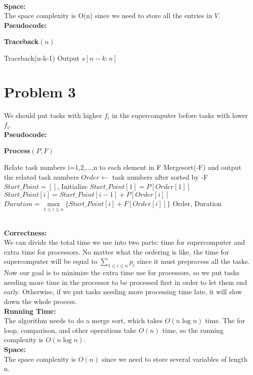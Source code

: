 \documentclass[twoside]{homework}
\begin{document}
\\\textbf{Space:} \quad
\\The space complexity is O(n) since we need to store all the entries in $V$.
\\\textbf{Pseudocode:} \quad
\begin{algorithm}
	\caption*{\textbf{Traceback$(n)$}}
	\begin{algorithmic}
		\RETURN 
		\ELSE
		\STATE Traceback(n-k-1)
		\STATE Output $s[n-k:n]$
		\ENDIF
		\ENDFOR
		\ENDIF
	\end{algorithmic}		
\end{algorithm}

\section*{Problem 3}
We should put tasks with higher $f_i$ in the supercomputer before tasks with lower $f_i$.
\\\textbf{Pseudocode:} \quad
\begin{algorithm}
	\caption*{\textbf{Process$(P,F)$}}
	\begin{algorithmic}
		\STATE Relate task numbers i=1,2,...,n to each element in F
		\STATE Mergesort(-F) and output the related task numbers 
		\STATE $Order\leftarrow$ task numbers after sorted by -F
		\STATE $Start\_Point=[ ]$, Initialize $Start\_Point[1]=P[Order[1]]$
		\STATE $Start\_Point[i]=Start\_Point[i-1]+P[Order[i]]$
		\ENDFOR
		\STATE $Duration=\max \limits_{1\le i\le n}\{Start\_Point[i]+F[Order[i]]\}$ 
		\RETURN Order, Duration
	\end{algorithmic}		
\end{algorithm}
\\\textbf{Correctness:} 
\\We can divide the total time we use into two parts: time for supercomputer and extra time for processors. No matter what the ordering is like, the time for supercomputer will be equal to $\sum \limits_{1\le i\le n}p_i$ since it must preprocess all the tasks. Now our goal is to minimize the extra time use for processors, so we put tasks needing more time in the processor to be processed first in order to let them end early. Otherwise, if we put tasks needing more processing time late, it will slow down the whole process.
\\\textbf{Running Time:} \quad
\\The algorithm needs to do a merge sort, which takes $O(n\log n)$ time. The for loop, comparison, and other operations take $O(n)$ time, so the running complexity is $O(n\log n)$.
\\\textbf{Space:} \quad
\\The space complexity is $O(n)$ since we need to store several variables of length n.
\end{document}
